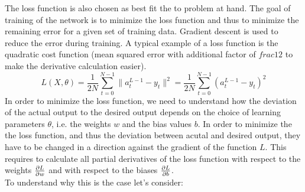 The loss function is also chosen as best fit the to problem at hand. The goal of training
of the network is to minimize the loss function and thus to minimize the remaining error
for a given set of training data. Gradient descent is used to reduce the error during
training. A typical example of a loss function is the quadratic cost function (mean
squared error with additional factor of $frac{1}{2}$ to make the derivative calculation
easier).
\begin{equation}
    L(X,\theta) = \frac{1}{2N} \sum_{t=0}^{N-1}{\lVert a^{L-1}_t - y_t \rVert^2} = \frac{1}{2N} \sum_{t=0}^{N-1}{(a^{L-1}_t - y_t)^2}
\end{equation}
In order to minimize the loss function, we need to understand how the deviation of the
actual output to the desired output depends on the choice of learning parameters $\theta$,
i.e. the weights $w$ and the bias values $b$. In order to minimize the the loss function,
and thus the deviation between acutal and desired output, they have to be changed in a
direction against the gradient of the function $L$. This requires to calculate all partial
derivatives of the loss function with respect to the weights $\frac{\partial {L}}{\partial {w}}$ and with respect
to the biases $\frac{\partial {L}}{\partial {b}}$.\\

To understand why this is the case let's consider:



